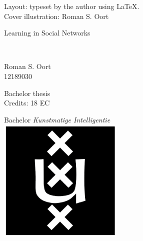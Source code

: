 \documentclass[a4paper, 12pt]{report}
\newcommand{\theTitle}{Learning in Social Networks}
\newcommand{\theSubTitle}{}
\newcommand{\theAuthor}{Roman S. Oort}
\newcommand{\theStudentID}{12189030}
\begin{document}
    \restoregeometry
    
\newpage

\thispagestyle{empty}
\vspace*{0.8\textheight}
\noindent
Layout: typeset by the author using \LaTeX. \\
Cover illustration: Roman S. Oort 
\restoregeometry

\newpage
\thispagestyle{empty}
\begin{center}

\vspace{2.5cm}


\begin{Huge}
\theTitle
\end{Huge} \\

\vspace{0.5 cm}

\begin{Large}
\theSubTitle
\end{Large}

\vspace{1.5cm}

\theAuthor\\
\theStudentID

\vspace{1.5cm}

Bachelor thesis\\
Credits: 18 EC

\vspace{0.5cm}

Bachelor \textit{Kunstmatige Intelligentie} \\
\vspace{0.25cm}
\includegraphics[width=0.075\paperwidth]{ThesisKI/UvAThesisLayout/uva_logo.png} \\
\vspace{0.1cm}


\end{center}
\end{document}
